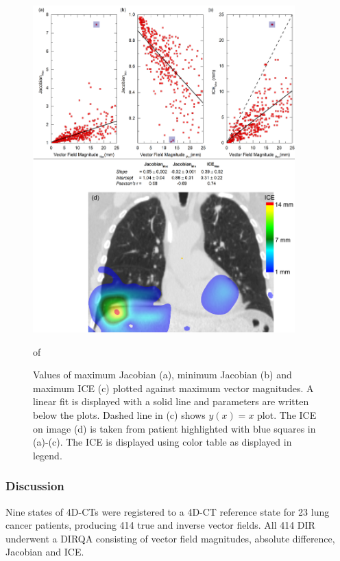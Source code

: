 \begin{figure}[H]
	\begin{center}		
		\includegraphics[width=0.9\textwidth]{./Vmm/Images/maxVf_lung.png}
		\caption{Values of maximum Jacobian (a), minimum Jacobian (b) and maximum ICE (c) plotted against maximum vector magnitudes. A linear fit is displayed with a solid line and parameters are written below the plots. Dashed line in (c) shows $y(x)= x$ plot.
			The ICE on image (d) is taken from patient highlighted with blue squares in (a)-(c).
			The ICE is displayed using color table as displayed in legend.}of
		\label{maxvf}
	\end{center}
\end{figure}

\newpage
\subsubsection{Discussion}
Nine states of 4D-CTs were registered to a 4D-CT reference state for 23 lung cancer patients, producing 414 true and inverse vector fields. All 414 DIR underwent a DIRQA consisting of vector field magnitudes, absolute difference, Jacobian and ICE.

